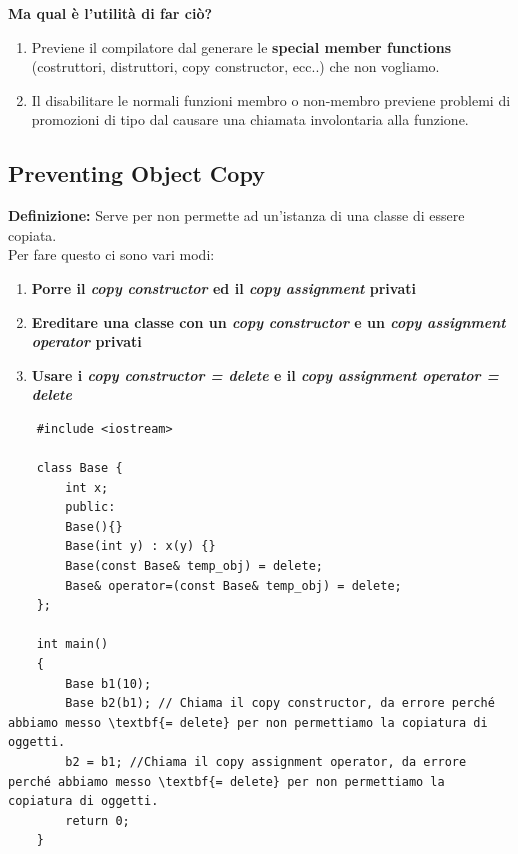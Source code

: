 \textsf{\small \textbf{Ma qual è l'utilità di far ciò?}} \\

\begin{enumerate}
	\item \textsf{\small Previene il compilatore dal generare le \textbf{special member functions} (costruttori, distruttori, copy constructor, ecc..) che non vogliamo.} \\
	\item \textsf{\small Il disabilitare le normali funzioni membro o non-membro previene problemi di promozioni di tipo dal causare una chiamata involontaria alla funzione.} \\
\end{enumerate}

\subsection{Preventing Object Copy}

\textsf{\small \textbf{Definizione: } Serve per non permette ad un'istanza di una classe di essere copiata.} \\

\textsf{\small Per fare questo ci sono vari modi: } \\

\begin{enumerate}
	\item \textsf{\small \textbf{Porre il \emph{copy constructor} ed il \emph{copy assignment} privati} }
	\item \textsf{\small \textbf{Ereditare una classe con un \emph{copy constructor} e un \emph{copy assignment operator} privati} }
	\item \textsf{\small \textbf{Usare i \emph{copy constructor = delete} e il \emph{copy assignment operator = delete}}}
\end{enumerate}

\begin{lstlisting}
	#include <iostream>
	
	class Base {
		int x;
		public:
		Base(){}
		Base(int y) : x(y) {}
		Base(const Base& temp_obj) = delete;
		Base& operator=(const Base& temp_obj) = delete;
	};
	
	int main()
	{
		Base b1(10);
		Base b2(b1); // Chiama il copy constructor, da errore perché abbiamo messo \textbf{= delete} per non permettiamo la copiatura di oggetti.
		b2 = b1; //Chiama il copy assignment operator, da errore perché abbiamo messo \textbf{= delete} per non permettiamo la copiatura di oggetti.
		return 0;
	}
\end{lstlisting}

